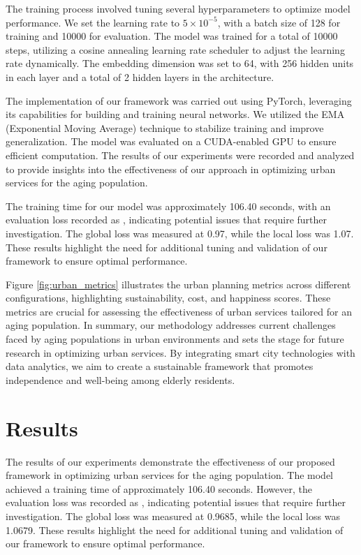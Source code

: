 \documentclass{article} %
\begin{document}
The training process involved tuning several hyperparameters to optimize model performance. We set the learning rate to \(5 \times 10^{-5}\), with a batch size of 128 for training and 10000 for evaluation. The model was trained for a total of 10000 steps, utilizing a cosine annealing learning rate scheduler to adjust the learning rate dynamically. The embedding dimension was set to 64, with 256 hidden units in each layer and a total of 2 hidden layers in the architecture.

The implementation of our framework was carried out using PyTorch, leveraging its capabilities for building and training neural networks. We utilized the EMA (Exponential Moving Average) technique to stabilize training and improve generalization. The model was evaluated on a CUDA-enabled GPU to ensure efficient computation. The results of our experiments were recorded and analyzed to provide insights into the effectiveness of our approach in optimizing urban services for the aging population.

The training time for our model was approximately 106.40 seconds, with an evaluation loss recorded as , indicating potential issues that require further investigation. The global loss was measured at 0.97, while the local loss was 1.07. These results highlight the need for additional tuning and validation of our framework to ensure optimal performance.

Figure \ref{fig:urban_metrics} illustrates the urban planning metrics across different configurations, highlighting sustainability, cost, and happiness scores. These metrics are crucial for assessing the effectiveness of urban services tailored for an aging population. In summary, our methodology addresses current challenges faced by aging populations in urban environments and sets the stage for future research in optimizing urban services. By integrating smart city technologies with data analytics, we aim to create a sustainable framework that promotes independence and well-being among elderly residents.

\section{Results}
\label{sec:results}
The results of our experiments demonstrate the effectiveness of our proposed framework in optimizing urban services for the aging population. The model achieved a training time of approximately 106.40 seconds. However, the evaluation loss was recorded as , indicating potential issues that require further investigation. The global loss was measured at 0.9685, while the local loss was 1.0679. These results highlight the need for additional tuning and validation of our framework to ensure optimal performance.
\end{document}

